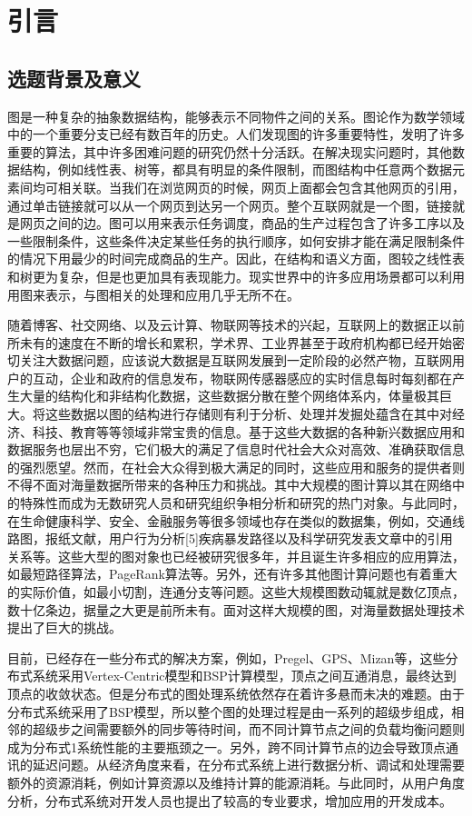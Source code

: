 
\chapter{引言}
\section{选题背景及意义}


图是一种复杂的抽象数据结构，能够表示不同物件之间的关系。图论作为数学领域中的一个重要分支已经有数百年的历史。人们发现图的许多重要特性，发明了许多重要的算法，其中许多困难问题的研究仍然十分活跃。在解决现实问题时，其他数据结构，例如线性表、树等，都具有明显的条件限制，而图结构中任意两个数据元素间均可相关联。当我们在浏览网页的时候，网页上面都会包含其他网页的引用，通过单击链接就可以从一个网页到达另一个网页。整个互联网就是一个图，链接就是网页之间的边。图可以用来表示任务调度，商品的生产过程包含了许多工序以及一些限制条件，这些条件决定某些任务的执行顺序，如何安排才能在满足限制条件的情况下用最少的时间完成商品的生产。因此，在结构和语义方面，图较之线性表和树更为复杂，但是也更加具有表现能力。现实世界中的许多应用场景都可以利用用图来表示，与图相关的处理和应用几乎无所不在。

随着博客、社交网络、以及云计算、物联网等技术的兴起，互联网上的数据正以前所未有的速度在不断的增长和累积，学术界、工业界甚至于政府机构都已经开始密切关注大数据问题，应该说大数据是互联网发展到一定阶段的必然产物，互联网用户的互动，企业和政府的信息发布，物联网传感器感应的实时信息每时每刻都在产生大量的结构化和非结构化数据，这些数据分散在整个网络体系内，体量极其巨大。将这些数据以图的结构进行存储则有利于分析、处理并发掘处蕴含在其中对经济、科技、教育等等领域非常宝贵的信息。基于这些大数据的各种新兴数据应用和数据服务也层出不穷，它们极大的满足了信息时代社会大众对高效、准确获取信息的强烈愿望。然而，在社会大众得到极大满足的同时，这些应用和服务的提供者则不得不面对海量数据所带来的各种压力和挑战。其中大规模的图计算以其在网络中的特殊性而成为无数研究人员和研究组织争相分析和研究的热门对象。与此同时，在生命健康科学、安全、金融服务等很多领域也存在类似的数据集，例如，交通线路图，报纸文献，用户行为分析[5]疾病暴发路径以及科学研究发表文章中的引用关系等。这些大型的图对象也已经被研究很多年，并且诞生许多相应的应用算法，如最短路径算法，PageRank算法等。另外，还有许多其他图计算问题也有着重大的实际价值，如最小切割，连通分支等问题。这些大规模图数动辄就是数亿顶点，数十亿条边，据量之大更是前所未有。面对这样大规模的图，对海量数据处理技术提出了巨大的挑战。

目前，已经存在一些分布式的解决方案，例如，Pregel、GPS、Mizan等，这些分布式系统采用Vertex-Centric模型和BSP计算模型，顶点之间互通消息，最终达到顶点的收敛状态。但是分布式的图处理系统依然存在着许多悬而未决的难题。由于分布式系统采用了BSP模型，所以整个图的处理过程是由一系列的超级步组成，相邻的超级步之间需要额外的同步等待时间，而不同计算节点之间的负载均衡问题则成为分布式1系统性能的主要瓶颈之一。另外，跨不同计算节点的边会导致顶点通讯的延迟问题。从经济角度来看，在分布式系统上进行数据分析、调试和处理需要额外的资源消耗，例如计算资源以及维持计算的能源消耗。与此同时，从用户角度分析，分布式系统对开发人员也提出了较高的专业要求，增加应用的开发成本。


